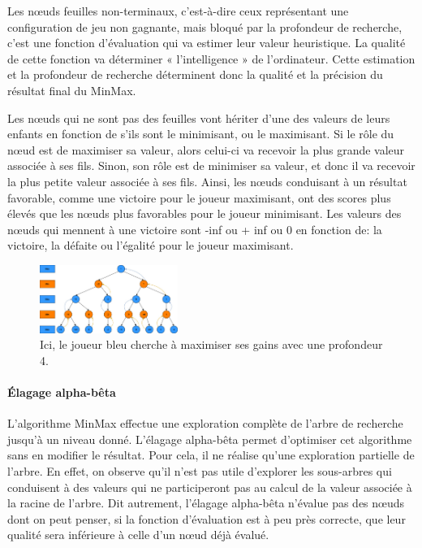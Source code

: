 Les nœuds feuilles non-terminaux, c'est-à-dire ceux représentant une configuration de jeu non gagnante, mais bloqué par la profondeur de recherche,
c'est une fonction d'évaluation qui va estimer leur valeur heuristique. La qualité de cette fonction va déterminer « l'intelligence » de 
l'ordinateur. Cette estimation et la profondeur de recherche déterminent donc la qualité et la précision du résultat final du MinMax.

Les nœuds qui ne sont pas des feuilles vont hériter d'une des valeurs de leurs enfants en fonction de s'ils sont le minimisant, ou le maximisant.
Si le rôle du nœud est de maximiser sa valeur, alors celui-ci va recevoir la plus grande valeur associée à ses fils. Sinon, son rôle est de 
minimiser sa valeur, et donc il va recevoir la plus petite valeur associée à ses fils.
Ainsi, les nœuds conduisant à un résultat favorable, comme une victoire pour le joueur maximisant, ont des scores plus
élevés que les nœuds plus favorables pour le joueur minimisant. Les valeurs des nœuds qui mennent à une victoire sont -inf ou + inf ou 0 en fonction de:
la victoire, la défaite ou l'égalité pour le joueur maximisant. 


\begin{figure}[h]
    \begin{center}
        \includegraphics[width=0.4\textwidth]{root/MinMax.jpeg}
    \end{center}
    \caption{Ici, le joueur bleu cherche à maximiser ses gains avec une profondeur 4.}\label{fig:min_max}
\end{figure}


\paragraph{Élagage alpha-bêta}
L'algorithme MinMax effectue une exploration complète de l'arbre de recherche jusqu'à un niveau donné. L'élagage alpha-bêta permet d'optimiser 
cet algorithme sans en modifier le résultat. Pour cela, il ne réalise qu'une exploration
partielle de l'arbre. En effet, on observe qu'il n'est pas utile d'explorer les sous-arbres qui conduisent à des valeurs
qui ne participeront pas au calcul de la valeur associée à la racine de l'arbre. Dit autrement, l'élagage alpha-bêta n'évalue pas des nœuds
dont on peut penser, si la fonction d'évaluation est à peu près correcte, que leur qualité sera inférieure à celle d'un nœud déjà évalué.

